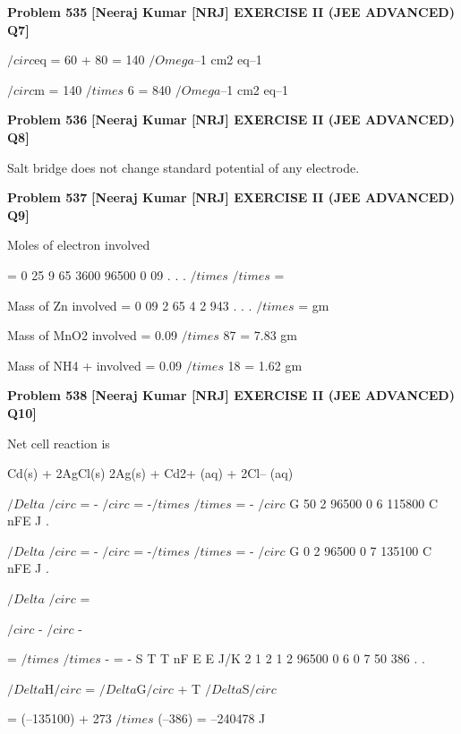 \begin{problembox}
\textbf{Problem 535} \hfill \textbf{[Neeraj Kumar [NRJ] EXERCISE II (JEE ADVANCED) Q7]}
\label{q:ext-nrj_all_questions-535}

 $/circ$eq = 60 + 80 = 140 $/Omega$--1 cm2 eq--1
 
  $/circ$m = 140 $/times$ 6 = 840 $/Omega$--1 cm2 eq--1
\end{problembox}

\begin{problembox}
\textbf{Problem 536} \hfill \textbf{[Neeraj Kumar [NRJ] EXERCISE II (JEE ADVANCED) Q8]}
\label{q:ext-nrj_all_questions-536}

Salt bridge does not change standard potential of 
any electrode.
\end{problembox}

\begin{problembox}
\textbf{Problem 537} \hfill \textbf{[Neeraj Kumar [NRJ] EXERCISE II (JEE ADVANCED) Q9]}
\label{q:ext-nrj_all_questions-537}

Moles of electron involved 
 
 = 0 25
9 65
3600
96500
0 09
.
.
.
$/times$
$/times$
=
 
   Mass of Zn involved = 0 09
2
65 4
2 943
.
.
.
$/times$
=
gm
 
 Mass of MnO2 involved = 0.09 $/times$ 87 = 7.83 gm
 
 Mass of NH4
+ involved = 0.09 $/times$ 18 = 1.62 gm
\end{problembox}

\begin{problembox}
\textbf{Problem 538} \hfill \textbf{[Neeraj Kumar [NRJ] EXERCISE II (JEE ADVANCED) Q10]}
\label{q:ext-nrj_all_questions-538}

Net cell reaction is
 
 Cd(s) + 2AgCl(s)   2Ag(s) + Cd2+ (aq) + 2Cl-- 
(aq)
 
 
$/Delta$
$/circ$
= -
$/circ$ = -$/times$
$/times$
= -
$/circ$
G 50
2
96500
0 6
115800
C
nFE
J
.
 
 
 
$/Delta$
$/circ$
= -
$/circ$ = -$/times$
$/times$
= -
$/circ$
G 0
2
96500
0 7
135100
C
nFE
J
.
 
 
$/Delta$ $/circ$ =
 
$/circ$ -
$/circ$
-
 
  
 
  =
$/times$
$/times$
-
= -
S
T
T
nF
E
E
J/K
2
1
2
1
2
96500
0 6
0 7
50
386
.
.
 
 $/Delta$H$/circ$ = $/Delta$G$/circ$ + T   $/Delta$S$/circ$
 
  = (--135100) + 273 $/times$ (--386) = --240478 J
\end{problembox}

